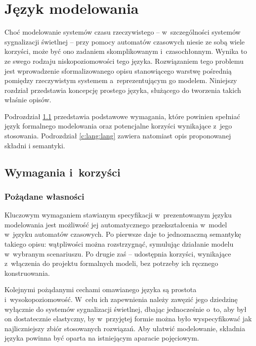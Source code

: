 \documentclass{pracamgr}
\newcommand{\upp}{\textsc{Uppaal}}
\theoremstyle{plain}
\begin{document}

\chapter{Język modelowania}
\label{c:lang}
Choć modelowanie systemów czasu rzeczywistego -- w~szczególności
systemów sygnalizacji świetlnej -- przy pomocy automatów czasowych
niesie ze sobą wiele korzyści, może być ono zadaniem skomplikowanym
i~czasochłonnym. Wynika to ze swego rodzaju niskopoziomowości tego
języka. Rozwiązaniem tego problemu jest wprowadzenie
sformalizowanego opisu stanowiącego warstwę pośrednią pomiędzy
rzeczywistym systemem a~reprezentującym go modelem.  Niniejszy
rozdział przedstawia koncepcję prostego języka, służącego do tworzenia
takich właśnie opisów.

Podrozdział \ref{c:lang:req} przedstawia podstawowe wymagania, które
powinien spełniać język formalnego modelowania oraz potencjalne
korzyści wynikające z~jego stosowania. Podrozdział \ref{c:lang:lang}
zawiera natomiast opis proponowanej składni i semantyki.

\section{Wymagania i~korzyści}
\label{c:lang:req}

\subsection{Pożądane własności}

Kluczowym wymaganiem stawianym specyfikacji w~prezentowanym języku
modelowania jest możliwość jej automatycznego przekształcenia w~model
w~języku automatów czasowych. Po pierwsze daje to jednoznaczną
semantykę takiego opisu: wątpliwości można rozstrzygnąć, symulując
działanie modelu w~wybranym scenariuszu. Po drugie zaś -- udostępnia
korzyści, wynikające z~włączenia do projektu formalnych modeli, bez
potrzeby ich ręcznego konstruowania.

Kolejnymi pożądanymi cechami omawianego języka są prostota
i~wysokopoziomowość. W~celu ich zapewnienia należy zawęzić jego dziedzinę
wyłącznie do systemów sygnalizacji świetlnej, dbając
jednocześnie o~to, aby był on dostatecznie elastyczny, by w~przyjętej
formie można było wyspecyfikować jak najliczniejszy zbiór stosowanych
rozwiązań. Aby ułatwić modelowanie, składnia języka powinna być oparta
na istniejącym aparacie pojęciowym.
\end{document}
